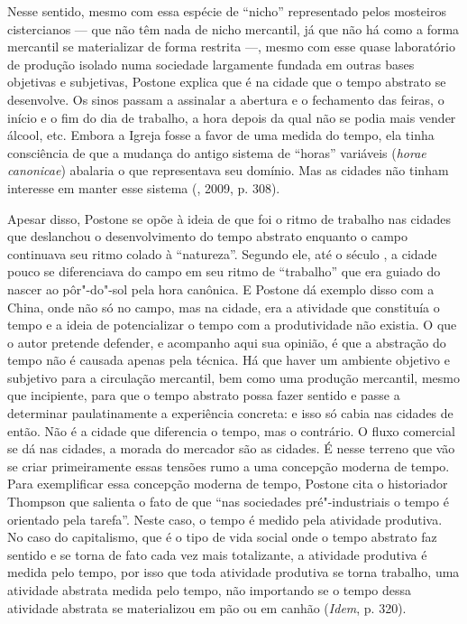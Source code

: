 Nesse sentido, mesmo com essa espécie de ``nicho'' representado pelos
mosteiros cistercianos --- que não têm nada de nicho mercantil, já que não há
como a forma mercantil se materializar de forma restrita ---, mesmo com esse quase
laboratório de produção isolado numa sociedade largamente fundada em
outras bases objetivas e subjetivas, Postone explica que é na cidade que
o tempo abstrato se desenvolve. Os sinos passam a assinalar a abertura e
o fechamento das feiras, o início e o fim do dia de trabalho, a hora
depois da qual não se podia mais vender álcool, etc. Embora a Igreja
fosse a favor de uma medida do tempo, ela tinha consciência de que a
mudança do antigo sistema de ``horas'' variáveis (\emph{horae}
\emph{canonicae}) abalaria o que representava seu domínio. Mas as
cidades não tinham interesse em manter esse sistema (, 2009, p. 308).

Apesar disso, Postone se opõe à ideia de que foi o ritmo de trabalho nas
cidades que deslanchou o desenvolvimento do tempo abstrato enquanto o
campo continuava seu ritmo colado à ``natureza''. Segundo ele, até o
século , a cidade pouco se diferenciava do campo em seu ritmo de
``trabalho'' que era guiado do nascer ao pôr"-do"-sol pela hora canônica.
E Postone dá exemplo disso com a China, onde não só no campo, mas na
cidade, era a atividade que constituía o tempo e a ideia de
potencializar o tempo com a produtividade não existia. O que o autor
pretende defender, e acompanho aqui sua opinião, é que a abstração do
tempo não é causada apenas pela técnica. Há que haver um ambiente
objetivo e subjetivo para a circulação mercantil, bem como uma produção
mercantil, mesmo que incipiente, para que o tempo abstrato possa fazer
sentido e passe a determinar paulatinamente a experiência concreta: e
isso só cabia nas cidades de então. Não é a cidade que diferencia o
tempo, mas o contrário. O fluxo comercial se dá nas cidades, a morada do
mercador são as cidades. É nesse terreno que vão se criar primeiramente
essas tensões rumo a uma concepção moderna de tempo. Para exemplificar
essa concepção moderna de tempo, Postone cita o historiador Thompson que
salienta o fato de que ``nas sociedades pré"-industriais o tempo é
orientado pela tarefa''. Neste caso, o tempo é medido pela atividade
produtiva. No caso do capitalismo, que é o tipo de vida social onde o tempo
abstrato faz sentido e se torna de fato cada vez mais totalizante, a
atividade produtiva é medida pelo tempo, por isso que toda atividade
produtiva se torna trabalho, uma atividade abstrata medida pelo tempo,
não importando se o tempo dessa atividade abstrata se materializou em
pão ou em canhão (\emph{Idem}, p. 320).

